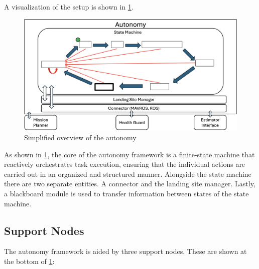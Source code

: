 A visualization of the setup is shown in \cref{fig:autonomy}.

\begin{figure}[ht!]
    \centering
    \includegraphics[scale=0.155]{images/system_overview/autonomy.png}
    \caption{Simplified overview of the autonomy}
    \label{fig:autonomy}
\end{figure}

As shown in \cref{fig:autonomy}, the core of the autonomy framework is a finite-state machine that reactively orchestrates task execution, ensuring that the individual actions are carried out in an organized and structured manner. Alongside the state machine there are two separate entities. A connector and the landing site manager. Lastly, a blackboard module is used to transfer information between states of the state machine.

\subsection{Support Nodes}\label{subsec:sup_nodes}

The autonomy framework is aided by three support nodes. These are shown at the bottom of \cref{fig:autonomy}:

